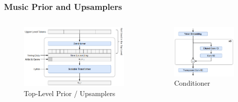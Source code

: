 \documentclass[dvipdfmx]{beamer}
\begin{document}
\begin{frame}
    \frametitle{Music Prior and Upsamplers}
    \begin{columns}
        \begin{column}[T]{0.60\textwidth}
            \begin{figure}
                \begin{center}
                    \includegraphics[scale=0.2]{figure/priormodeldetail.png}
                    \caption{Top-Level Prior / Upsamplers}
                \end{center}
            \end{figure}
        \end{column}
        \begin{column}[T]{0.40\textwidth}
            \begin{figure}
                \begin{center}
                    \includegraphics[scale=0.2]{figure/conditionerdetail.png}
                    \caption{Conditioner}
                \end{center}
            \end{figure}
        \end{column}
    \end{columns}
\end{frame}
\end{document}
